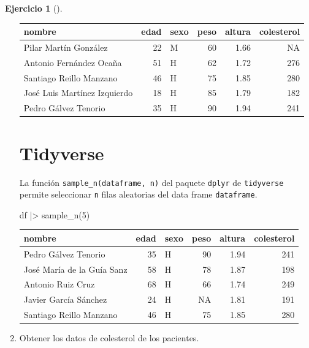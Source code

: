 \documentclass[
  a4paper,
]{scrreport}
\newenvironment{Shaded}{\begin{snugshade}}{\end{snugshade}}
\newcommand{\DecValTok}[1]{\textcolor[rgb]{0.68,0.00,0.00}{#1}}
\newcommand{\FunctionTok}[1]{\textcolor[rgb]{0.28,0.35,0.67}{#1}}
\newcommand{\NormalTok}[1]{\textcolor[rgb]{0.00,0.23,0.31}{#1}}
\newcommand{\SpecialCharTok}[1]{\textcolor[rgb]{0.37,0.37,0.37}{#1}}
\theoremstyle{definition}
\newtheorem{exercise}{Ejercicio}[chapter]
\theoremstyle{remark}
\begin{document}
\begin{exercise}[]
\begin{enumerate}
\begin{tcolorbox}
  \begin{longtable}[]{@{}lrlrrr@{}}
  \toprule\noalign{}
  nombre & edad & sexo & peso & altura & colesterol \\
  \midrule\noalign{}
  \endhead
  \bottomrule\noalign{}
  \endlastfoot
  Pilar Martín González & 22 & M & 60 & 1.66 & NA \\
  Antonio Fernández Ocaña & 51 & H & 62 & 1.72 & 276 \\
  Santiago Reillo Manzano & 46 & H & 75 & 1.85 & 280 \\
  José Luis Martínez Izquierdo & 18 & H & 85 & 1.79 & 182 \\
  Pedro Gálvez Tenorio & 35 & H & 90 & 1.94 & 241 \\
  \end{longtable}

  \section{Tidyverse}

  La función \texttt{sample\_n(dataframe,\ n)} del paquete
  \texttt{dplyr} de \texttt{tidyverse} permite seleccionar \texttt{n}
  filas aleatorias del data frame \texttt{dataframe}.

\begin{Shaded}
\begin{Highlighting}[]
\NormalTok{df }\SpecialCharTok{|\textgreater{}} \FunctionTok{sample\_n}\NormalTok{(}\DecValTok{5}\NormalTok{)}
\end{Highlighting}
\end{Shaded}

  \begin{longtable}[]{@{}lrlrrr@{}}
  \toprule\noalign{}
  nombre & edad & sexo & peso & altura & colesterol \\
  \midrule\noalign{}
  \endhead
  \bottomrule\noalign{}
  \endlastfoot
  Pedro Gálvez Tenorio & 35 & H & 90 & 1.94 & 241 \\
  José María de la Guía Sanz & 58 & H & 78 & 1.87 & 198 \\
  Antonio Ruiz Cruz & 68 & H & 66 & 1.74 & 249 \\
  Javier García Sánchez & 24 & H & NA & 1.81 & 191 \\
  Santiago Reillo Manzano & 46 & H & 75 & 1.85 & 280 \\
  \end{longtable}

  \end{tcolorbox}
\item
  Obtener los datos de colesterol de los pacientes.


\end{enumerate}
\end{exercise}
\end{document}
